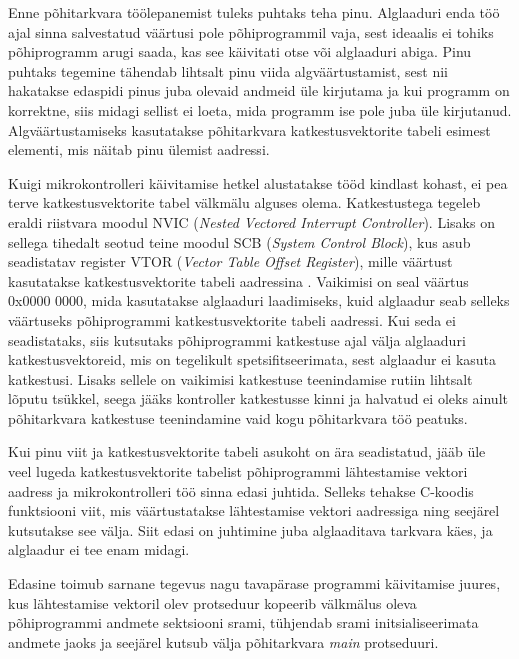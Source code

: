 \documentclass[12pt,a4paper]{article}
\begin{document}
Enne põhitarkvara töölepanemist tuleks puhtaks teha pinu. Alglaaduri enda töö
ajal sinna salvestatud väärtusi pole põhiprogrammil vaja, sest
ideaalis ei tohiks põhiprogramm arugi saada, kas see käivitati otse või
alglaaduri abiga. Pinu puhtaks tegemine tähendab lihtsalt pinu viida
algväärtustamist, sest nii hakatakse edaspidi pinus juba olevaid andmeid üle
kirjutama ja kui programm on korrektne, siis midagi sellist ei loeta, mida
programm ise pole juba üle kirjutanud. Algväärtustamiseks kasutatakse
põhitarkvara katkestusvektorite tabeli esimest elementi, mis näitab pinu ülemist
aadressi.

Kuigi mikrokontrolleri käivitamise hetkel alustatakse tööd kindlast kohast, ei
pea terve katkestusvektorite tabel välkmälu alguses olema. Katkestustega tegeleb
eraldi riistvara moodul NVIC (\textit{Nested Vectored Interrupt Controller}).
Lisaks on sellega tihedalt seotud teine moodul SCB (\textit{System Control
Block}), kus asub seadistatav register VTOR (\textit{Vector Table Offset
Register}), mille väärtust kasutatakse katkestusvektorite tabeli aadressina
\cite{CM3pm}. Vaikimisi on seal väärtus 0x0000 0000, mida kasutatakse alglaaduri
laadimiseks, kuid alglaadur seab selleks väärtuseks põhiprogrammi
katkestusvektorite tabeli aadressi. Kui seda ei seadistataks, siis kutsutaks
põhiprogrammi katkestuse ajal välja alglaaduri katkestusvektoreid, mis on
tegelikult spetsifitseerimata, sest alglaadur ei kasuta katkestusi. Lisaks
sellele on vaikimisi katkestuse teenindamise rutiin lihtsalt lõputu tsükkel,
seega jääks kontroller katkestusse kinni ja halvatud ei oleks ainult
põhitarkvara katkestuse teenindamine vaid kogu põhitarkvara töö peatuks.

Kui pinu viit ja katkestusvektorite tabeli asukoht on ära seadistatud, jääb üle
veel lugeda katkestusvektorite tabelist põhiprogrammi lähtestamise vektori
aadress ja mikrokontrolleri töö sinna edasi juhtida. Selleks tehakse C-koodis
funktsiooni viit, mis väärtustatakse lähtestamise vektori aadressiga ning
seejärel kutsutakse see välja. Siit edasi on juhtimine juba alglaaditava tarkvara
käes, ja alglaadur ei tee enam midagi.

Edasine toimub sarnane tegevus nagu tavapärase programmi käivitamise juures, kus
lähtestamise vektoril olev protseduur kopeerib välkmälus oleva põhiprogrammi
andmete sektsiooni \gls{sram}i, tühjendab \gls{sram}i initsialiseerimata andmete
jaoks ja seejärel kutsub välja põhitarkvara \textit{main} protseduuri.
\end{document}
